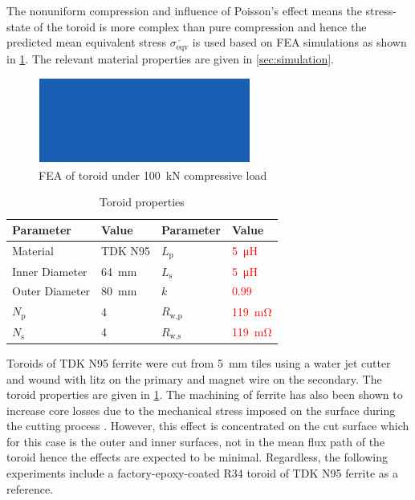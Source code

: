 \documentclass[conference]{IEEEtran}
\begin{document}
The nonuniform compression and influence of Poisson's effect means the stress-state of the toroid is more complex than pure compression and hence the predicted mean equivalent stress $\overline{\sigma_\text{eqv}}$ is used based on FEA simulations as shown in \cref{fig:holderfea}. 
The relevant material properties are given in \cref{sec:simulation}.

\begin{figure}
  \centering
  \includegraphics{figures/holderfea.pdf}
  \caption{FEA of toroid under \SI{100}{\kilo\newton} compressive load}
  \label{fig:holderfea}
\end{figure}
\begin{table}
  \centering
  \caption{Toroid properties}
  \begin{tabular}{@{}llll@{}}
    \toprule
    Parameter & Value & Parameter & Value \\ \midrule
    Material & TDK N95 & $L_\text{p}$ & \textcolor{red}{\SI{5}{\micro\henry}} \\
    Inner Diameter & \SI{64}{\milli\meter} & $L_\text{s}$ & \textcolor{red}{\SI{5}{\micro\henry}} \\
    Outer Diameter & \SI{80}{\milli\meter} & $k$ & \textcolor{red}{$0.99$} \\
    $N_\text{p}$ & 4 & $R_\text{w,p}$ & \textcolor{red}{\SI{119}{\milli\ohm}} \\
    $N_\text{s}$ & 4 & $R_\text{w,s}$ & \textcolor{red}{\SI{119}{\milli\ohm}} \\
    \bottomrule
  \end{tabular}
  \label{tab:toroidproperties}
\end{table}

Toroids of TDK N95 ferrite were cut from \SI{5}{\milli\meter} tiles using a water jet cutter and wound with litz on the primary and magnet wire on the secondary. 
The toroid properties are given in \cref{tab:toroidproperties}.
The machining of ferrite has also been shown to increase core losses due to the mechanical stress imposed on the surface during the cutting process \cite{neumayrOriginQuantificationIncreased2019}. 
However, this effect is concentrated on the cut surface which for this case is the outer and inner surfaces, not in the mean flux path of the toroid hence the effects are expected to be minimal. 
Regardless, the following experiments include a factory-epoxy-coated R34 toroid of TDK N95 ferrite as a reference. 
\end{document}
